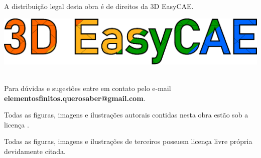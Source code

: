 \documentclass[
	14pt,				%
	openright,			%
	oneside
	a4paper,			%
	chapter=TITLE,		%
	section=TITLE,		%
	subsection=TITLE,	%
	subsubsection=TITLE,%
	english,			%
	french,				%
	spanish,			%
	brazil,				%
	sumario=tradicional
]{abntex2}
\renewcommand{\textual}{%
  \pagestyle{abntbookheadings}%
  \aliaspagestyle{chapter}{abntbookchapfirst}%
  \nouppercaseheads%
  \bookmarksetup{startatroot}%
}
\begin{document}
\begin{titlingpage}
A distribuição legal desta obra é de direitos da 3D EasyCAE.

\begin{center}
	\includegraphics[width=0.7\linewidth]{logoNome2_svg}
\end{center}
$ $\\
Para dúvidas e sugestões entre em contato pelo e-mail \textbf{elementosfinitos.querosaber@gmail.com}.

\vspace*{\fill}
Todas as figuras, imagens e ilustrações autorais contidas nesta obra estão sob a licença \doclicenseName.\\
\begin{center}
	\doclicenseImage
\end{center}
Todas as figuras, imagens e ilustrações de terceiros possuem licença livre própria devidamente citada.\\
\end{titlingpage}

\begin{agradecimentos}
\end{agradecimentos}
\tableofcontents* 
\cleardoublepage
\mainmatter
%
\newpage
%
%
%
%
%
%
%
%
%
%
%
\end{document}
